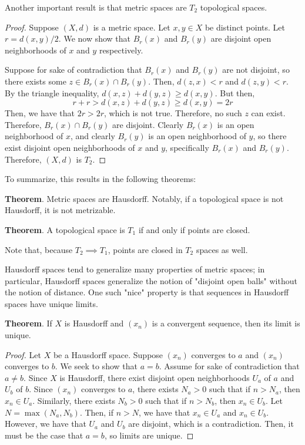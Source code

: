 \begin{framed}
Another important result is that metric spaces are $T_2$ topological spaces.\vspace{-1em} \begin{proof}
    Suppose $(X,d)$ is a metric space. Let $x,y\in X$ be distinct points. Let $r=d(x,y)/2$. We now show that $B_r(x)$ and $B_r(y)$ are disjoint open neighborhoods of $x$ and $y$ respectively.

    Suppose for sake of contradiction that $B_r(x)$ and $B_r(y)$ are not disjoint, so there exists some $z\in B_r(x)\cap B_r(y)$. Then, $d(z,x)< r$ and $d(z,y)<r$. By the triangle inequality, $d(x,z) + d(y,z) \geq d(x,y)$. But then, \[r+r > d(x,z)+ d(y,z) \geq d(x,y) = 2r\] Then, we have that $2r>2r$, which is not true. Therefore, no such $z$ can exist. Therefore, $B_r(x)\cap B_r(y)$ are disjoint. Clearly $B_r(x)$ is an open neighborhood of $x$, and clearly $B_r(y)$ is an open neighborhood of $y$, so there exist disjoint open neighborhoods of $x$ and $y$, specifically $B_r(x)$ and $B_r(y)$. Therefore, $(X,d)$ is $T_2$.
\end{proof}

To summarize, this results in the following theorems:

\textbf{Theorem}. Metric spaces are Hausdorff. Notably, if a topological space is not Hausdorff, it is not metrizable.

\textbf{Theorem}. A topological space is $T_1$ if and only if points are closed.

Note that, because $T_2\implies T_1$, points are closed in $T_2$ spaces as well.
\end{framed}

Hausdorff spaces tend to generalize many properties of metric spaces; in particular, Hausdorff spaces generalize the notion of "disjoint open balls" without the notion of distance. One such "nice" property is that sequences in Hausdorff spaces have unique limits.

\textbf{Theorem}. If $X$ is Hausdorff and $(x_n)$ is a convergent sequence, then its limit is unique.\vspace{-1em}
\begin{proof}
    Let $X$ be a Hausdorff space. Suppose $(x_n)$ converges to $a$ and $(x_n)$ converges to $b$. We seek to show that $a=b$.
    Assume for sake of contradiction that $a\neq b$. Since $X$ is Hausdorff, there exist disjoint open neighborhoods $U_a$ of $a$ and $U_b$ of $b$. Since $(x_n)$ converges to $a$, there exists $N_a>0$ such that if $n>N_a$, then $x_n\in U_a$. Similarly, there exists $N_b>0$ such that if $n>N_b$, then $x_n\in U_b$. Let $N=\max(N_a,N_b)$. Then, if $n>N$, we have that $x_n\in U_a$ and $x_n\in U_b$. However, we have that $U_a$ and $U_b$ are disjoint, which is a contradiction. Then, it must be the case that $a=b$, so limits are unique.
\end{proof}

